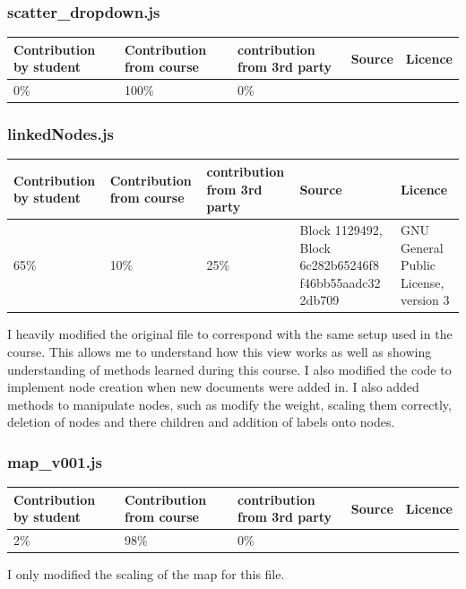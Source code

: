 \documentclass[a4paper, 11pt]{article}
\begin{document}
\subsubsection{scatter\_dropdown.js}
\begin{center}
 \begin{tabular}{||p{}|p{}|p{}|p{}|p{}||} 
 \hline
 Contribution by student & Contribution from course & contribution from 3rd party & Source & Licence 
 \\
 \hline
 0\% & 100\% & 0\% & & 
 \\
 \hline
\end{tabular}
\end{center}


\subsubsection{linkedNodes.js}
\begin{center}
 \begin{tabular}{||p{}|p{}|p{}|p{}|p{}||} 
 \hline
 Contribution by student & Contribution from course & contribution from 3rd party & Source & Licence 
 \\
 \hline
 65\% & 10\% & 25\% & Block 1129492, Block 6c282b65246f8 f46bb55aadc32 2db709 &  GNU General Public License, version 3
 \\
 \hline
\end{tabular}
\end{center}
I heavily modified the original file to correspond with the same setup used in the course. This allows me to understand how this view works as well as showing understanding of methods learned during this course. I also modified the code to implement node creation when new documents were added in. I also added methods to manipulate nodes, such as modify the weight, scaling them correctly, deletion of nodes and there children and addition of labels onto nodes.


\subsubsection{map\_v001.js}
\begin{center}
 \begin{tabular}{||p{}|p{}|p{}|p{}|p{}||} 
 \hline
 Contribution by student & Contribution from course & contribution from 3rd party & Source & Licence 
 \\
 \hline
 2\% & 98\% & 0\% &  & 
 \\
 \hline
\end{tabular}
\end{center}
I only modified the scaling of the map for this file.
\end{document}
